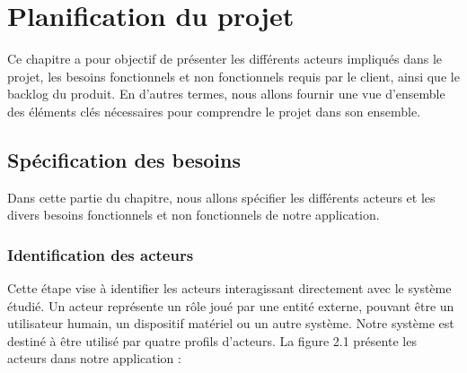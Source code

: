 \chapter{ Planification du projet}



Ce chapitre a pour objectif de présenter les différents acteurs impliqués dans le projet, les besoins fonctionnels et non fonctionnels  requis par le client, ainsi que le backlog du produit. En d'autres termes, nous allons fournir une vue d'ensemble des éléments clés nécessaires pour comprendre le projet dans son ensemble.
\section{Spécification des besoins}
Dans cette partie du chapitre, nous allons spécifier les différents acteurs et les divers besoins fonctionnels et non fonctionnels de notre application.
\subsection{Identification des acteurs}
Cette étape vise à identifier les acteurs interagissant directement avec le système étudié. Un acteur représente un rôle joué par une entité externe, pouvant être un utilisateur humain, un dispositif matériel ou un autre système. Notre système est destiné à être utilisé par quatre profils d'acteurs. La figure 2.1 présente les acteurs dans notre application :




